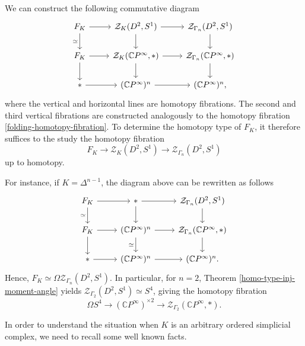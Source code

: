 \documentclass[a4paper,11pt]{article}
\theoremstyle{definition}
\newcommand{\C}{\mathbb{C}}
\newcommand{\ZZ}{\mathcal{Z}}
\begin{document}
We can construct the following commutative diagram 
\[
\begin{tikzcd}
	F_K  \arrow[r] \arrow[d,swap,"\simeq"] & \ZZ_K(D^2,S^1) \arrow[d] \arrow[r] & \ZZ_{\Gamma_n}(D^2,S^1) \arrow[d]\\
    F_K \arrow[d] \arrow[r] & \ZZ_K(\C P^\infty,*) \arrow[d]\arrow[r] &  \ZZ_{\Gamma_n}(\C P^\infty,*) \arrow[d,]\\ 
	* \arrow[r] & (\C P^\infty)^{n} \arrow[r] & (\C P^\infty)^{n},
\end{tikzcd}
\]
where the vertical and horizontal lines are homotopy fibrations. The second and third vertical fibrations are constructed analogously to the homotopy fibration \ref{folding-homotopy-fibration}. To determine the homotopy type of $F_K$, it therefore suffices to the study the homotopy fibration 
\[
F_K \to \ZZ_K(D^2,S^1)\to \ZZ_{\Gamma_n}(D^2,S^1)
\]
up to homotopy. 

For instance, if $K = \Delta^{n-1}$, the diagram above can be rewritten as follows
\[
\begin{tikzcd}
    F_K  \arrow[r] \arrow[d,swap,"\simeq"] & * \arrow[d] \arrow[r] & \ZZ_{\Gamma_n}(D^2,S^1) \arrow[d]\\
    F_K \arrow[d] \arrow[r] & (\C P^\infty)^{n} \arrow[d,swap,"\simeq"]\arrow[r] &  \ZZ_{\Gamma_n}(\C P^\infty,*) \arrow[d  ]\\ 
    * \arrow[r] & (\C P^\infty)^{n} \arrow[r] & (\C P^\infty)^{n}.
\end{tikzcd}
\]
Hence, $F_K \simeq \Omega \ZZ_{\Gamma_n}(D^2,S^1)$. In particular, for $n=2$, Theorem \ref{homo-type-inj-moment-angle} yields 
$\ZZ_{\Gamma_2}(D^2,S^1) \simeq S^4$, giving the homotopy fibration
\[
\Omega S^4 \to (\C P^\infty)^{\times 2} \to \ZZ_{\Gamma_2}(\C P^\infty,*).
\]


In order to understand the situation when $K$ is an arbitrary ordered simplicial complex, we need to recall some well known facts. 
\end{document}
